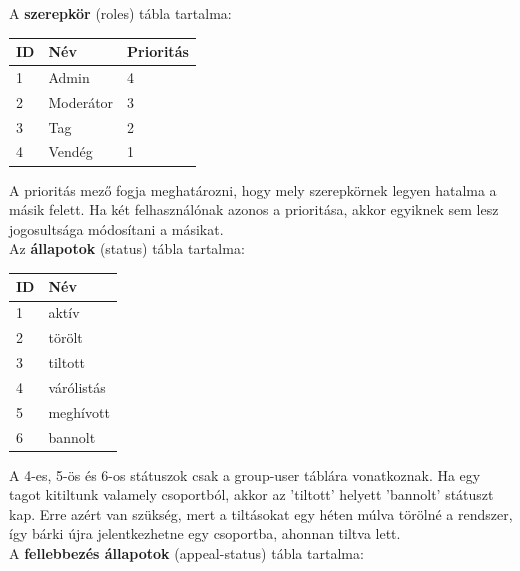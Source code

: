 \documentclass[
]{thesis-ekf}
\theoremstyle{definition}
\theoremstyle{remark}
\begin{document}
\vspace{5mm}
\noindent
A \textbf{szerepkör} (roles) tábla tartalma:

\begin{table}[H]
	\begin{tabular}{|l|l|l|}
		\hline
		\rule{0pt}{4ex}\rule[-2ex]{0pt}{0pt}
		\textbf{ID} &
		\textbf{Név} &
		\textbf{Prioritás} \\
		\hline
		1 &
		Admin &
		4 \\
		\hline
		2 &
		Moderátor &
		3 \\
		\hline
		3 &
		Tag &
		2 \\
		\hline
		4 &
		Vendég &
		1 \\
		\hline
	\end{tabular}
\end{table}
\noindent
A prioritás mező fogja meghatározni, hogy mely szerepkörnek legyen hatalma a másik felett. Ha két felhasználónak azonos a prioritása, akkor egyiknek sem lesz jogosultsága módosítani a másikat.
\vspace{5mm}
\\

\pagebreak
\noindent
Az \textbf{állapotok} (status) tábla tartalma:

\begin{table}[H]
	\begin{tabular}{|l|l|}
		\hline
		\rule{0pt}{4ex}\rule[-2ex]{0pt}{0pt}
		\textbf{ID} &
		\textbf{Név} \\
		\hline
		1 &
		aktív \\
		\hline
		2 &
		törölt \\
		\hline
		3 &
		tiltott \\
		\hline
		4 &
		várólistás \\
		\hline
		5 &
		meghívott \\
		\hline
		6 &
		bannolt \\
		\hline
	\end{tabular}
\end{table}
\noindent
A 4-es, 5-ös és 6-os státuszok csak a group-user táblára vonatkoznak. Ha egy tagot kitiltunk valamely csoportból, akkor az 'tiltott' helyett 'bannolt' státuszt kap. Erre azért van szükség, mert a tiltásokat egy héten múlva törölné a rendszer, így bárki újra jelentkezhetne egy csoportba, ahonnan tiltva lett.
\vspace{5mm}
\\
\noindent
A \textbf{fellebbezés állapotok} (appeal-status) tábla tartalma:
\end{document}
